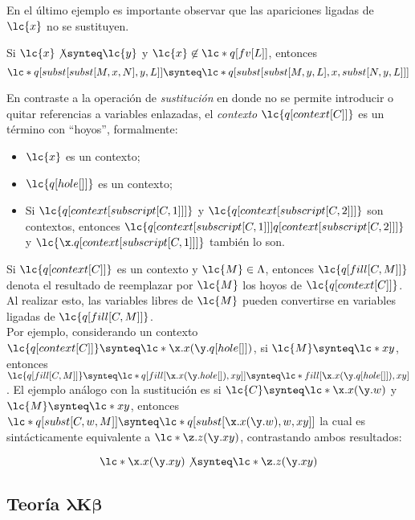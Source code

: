 En el último ejemplo es importante observar que las apariciones ligadas de
\(\lc{x}\) no se sustituyen. \\

\begin{lema}
Si \(\lc{x} \not\synteq \lc{y}\) y \(\lc{x}\not\in \lc*{q[fv[L]]}\), entonces
\[\lc*{q[subst[subst[M,x,N],y,L]]} \synteq \lc*{q[subst[subst[M,y,L],x,subst[N,y,L]]]}\]
\end{lema}

En contraste a la operación de \emph{sustitución} en donde no se permite
introducir o quitar referencias a variables enlazadas, el \emph{contexto}
\(\lc{q[context[C]]}\) es un término con ``hoyos'', formalmente:\\

\begin{itemize}
\item \(\lc{x}\) es un contexto;
\item \(\lc{q[hole[]]}\) es un contexto;
\item Si \(\lc{q[context[subscript[C,1]]]}\) y
  \(\lc{q[context[subscript[C,2]]]}\) son contextos, entonces
  \(\lc{q[context[subscript[C,1]]] q[context[subscript[C,2]]]}\) y
  \(\lc{\x.q[context[subscript[C,1]]]}\) también lo son.
\end{itemize}

Si \(\lc{q[context[C]]}\) es un contexto y \(\lc{M} \in \Lambda\), entonces
\(\lc{q[fill[C,M]]}\) denota el resultado de reemplazar por \(\lc{M}\) los hoyos
de \(\lc{q[context[C]]}\). Al realizar esto, las variables libres de \(\lc{M}\)
pueden convertirse en variables ligadas de \(\lc{q[fill[C,M]]}\). \\

Por ejemplo, considerando un contexto \(\lc{q[context[C]]} \synteq
\lc*{\x.x(\y.q[hole[]])}\), si \(\lc{M} \synteq \lc*{x y}\), entonces
\(\lc{q[fill[C,M]]} \synteq \lc*{q[fill[\x.x(\y.hole[]), x y]]} \synteq
\lc*{fill[\x.x(\y.q[hole[]]), x y]}\). El ejemplo análogo con la sustitución es
si \(\lc{C} \synteq \lc*{\x.x(\y.w)}\) y \(\lc{M} \synteq \lc*{x y}\), entonces
\(\lc*{q[subst[C,w,M]]} \synteq \lc*{q[subst[\x.x(\y.w),w,x y]]}\) la cual es
sintácticamente equivalente a \(\lc*{\z.z(\y.x y)}\), contrastando ambos
resultados:

\[\lc*{\x.x(\y.x y)} \not\synteq \lc*{\z.z(\y.x y)}\]


\subsection{Teoría \texorpdfstring{\(\boldsymbol{\lambda K \beta}\)}{\lambda K
    \beta}}

